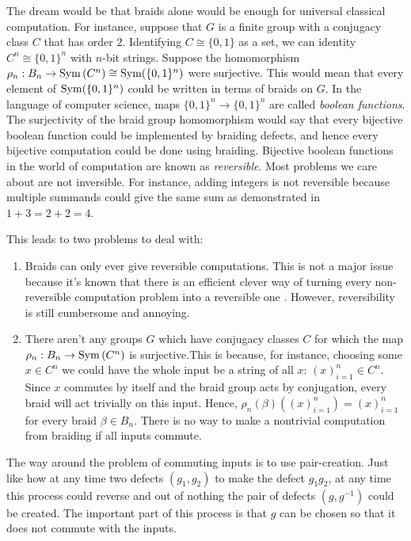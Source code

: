 The dream would be that braids alone would be enough for universal classical computation. For instance, suppose that $G$ is a finite group with a conjugacy class $C$ that has order $2$. Identifying $C\cong \{0,1\}$ as a set, we can identity $C^n\cong \{0,1\}^{n}$ with $n$-bit strings. Suppose the homomorphism $\rho_n:B_n\to \operatorname{Sym}\left(C^n\right)\cong \operatorname{Sym}(\{0,1\}^n)$ were surjective. This would mean that every element of $\operatorname{Sym}(\{0,1\}^n)$ could be written in terms of braids on $G$. In the language of computer science, maps $\{0,1\}^n\to \{0,1\}^n$ are called \textit{boolean functions}. The surjectivity of the braid group homomorphism would say that every bijective boolean function could be implemented by braiding defects, and hence every bijective computation could be done using braiding. Bijective boolean functions in the world of computation are known as \textit{reversible}. Most problems we care about are not inversible. For instance, adding integers is not reversible because multiple summands could give the same sum as demonstrated in $1 + 3 = 2 + 2 = 4$.

This leads to two problems to deal with:

\begin{enumerate}
\item Braids can only ever give reversible computations. This is not a major issue because it's known that there is an efficient clever way of turning every non-reversible computation problem into a reversible one \cite{bennett1973logical}. However, reversibility is still cumbersome and annoying.

\item There aren't any groups $G$ which have conjugacy classes $C$ for which the map $\rho_n: B_n \to \operatorname{Sym}\left(C^n\right)$ is surjective.This is because, for instance, choosing some $x\in C^n$ we could have the whole input be a string of all $x$: $(x)_{i=1}^n\in C^n$. Since $x$ commutes by itself and the braid group acts by conjugation, every braid will act trivially on this input. Hence, $\rho_n(\beta)\left((x)_{i=1}^n\right)=(x)_{i=1}^n$ for every braid $\beta\in B_n$. There is no way to make a nontrivial computation from braiding if all inputs commute. 

\end{enumerate}

The way around the problem of commuting inputs is to use pair-creation. Just like how at any time two defects $(g_1,g_2)$ to make the defect $g_1g_2$, at any time this process could reverse and out of nothing the pair of defects $(g,g^{-1})$ could be created. The important part of this process is that $g$ can be chosen so that it does not commute with the inputs.

